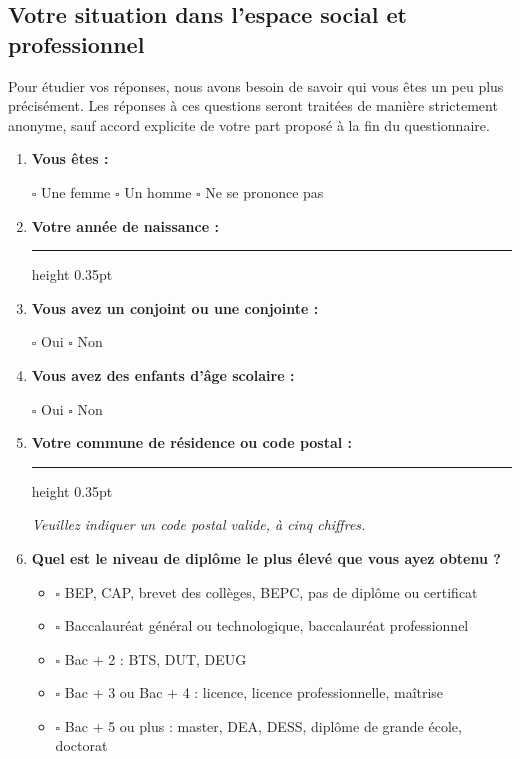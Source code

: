 \documentclass[12pt,a4paper]{article}
\newcommand{\Case}{\(\square\)}
\newcommand{\Ligne}{\leavevmode\leaders\hrule height 0.35pt\hfill\kern0pt}
\newcommand{\Question}[1]{\item \textbf{#1}\par\vspace{0.1em}}
\newcommand{\Consigne}[1]{\par{\small\itshape #1}\par}
\begin{document}
\subsection{Votre situation dans l'espace social et professionnel}

Pour étudier vos réponses, nous avons besoin de savoir qui vous êtes un peu plus précisément. Les réponses à ces questions seront traitées de manière strictement anonyme, sauf accord explicite de votre part proposé à la fin du questionnaire.

\begin{enumerate}[label=\textbf{\arabic*.},leftmargin=0pt,itemindent=1.9em,labelwidth=1.4em,labelsep=0.5em]

\Question{Vous êtes :}

\Case{} Une femme \hspace{1cm} \Case{} Un homme \hspace{1cm} \Case{} Ne se prononce pas

\Question{Votre année de naissance :}

\Ligne

\Question{Vous avez un conjoint ou une conjointe :}

\Case{} Oui \hspace{1cm} \Case{} Non

\Question{Vous avez des enfants d'âge scolaire :}

\Case{} Oui \hspace{1cm} \Case{} Non

\Question{Votre commune de résidence ou code postal :}

\Ligne

\Consigne{Veuillez indiquer un code postal valide, à cinq chiffres.}

\Question{Quel est le niveau de diplôme le plus élevé que vous ayez obtenu ?}

\begin{itemize}[leftmargin=1.5cm]
    \item[] \Case{} BEP, CAP, brevet des collèges, BEPC, pas de diplôme ou certificat
    \item[] \Case{} Baccalauréat général ou technologique, baccalauréat professionnel
    \item[] \Case{} Bac + 2 : BTS, DUT, DEUG
    \item[] \Case{} Bac + 3 ou Bac + 4 : licence, licence professionnelle, maîtrise
    \item[] \Case{} Bac + 5 ou plus : master, DEA, DESS, diplôme de grande école, doctorat
\end{itemize}


\end{enumerate}
\end{document}
